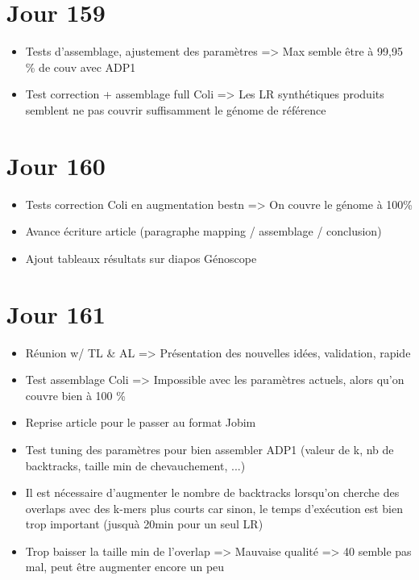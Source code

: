 \documentclass[12pt]{report}
\begin{document}
\section{Jour 159}

\begin{itemize}
	\item Tests d'assemblage, ajustement des paramètres => Max semble être à 99,95 \% de couv avec ADP1
	
	\item Test correction + assemblage full Coli => Les LR synthétiques produits semblent ne pas couvrir suffisamment le génome de référence
\end{itemize}

\section{Jour 160}

\begin{itemize}
	\item Tests correction Coli en augmentation bestn => On couvre le génome à 100\%
	
	\item Avance écriture article (paragraphe mapping / assemblage / conclusion)
	
	\item Ajout tableaux résultats sur diapos Génoscope
\end{itemize}

\section{Jour 161}

\begin{itemize}
	\item Réunion w/ TL \& AL => Présentation des nouvelles idées, validation, rapide
	
	\item Test assemblage Coli => Impossible avec les paramètres actuels, alors qu'on couvre bien à 100 \%
	
	\item Reprise article pour le passer au format Jobim
	
	\item Test tuning des paramètres pour bien assembler ADP1 (valeur de k, nb de backtracks, taille min de chevauchement, ...)
	
	\item Il est nécessaire d'augmenter le nombre de backtracks lorsqu'on cherche des overlaps avec des k-mers plus courts
		  car sinon, le temps d'exécution est bien trop important (jusquà 20min pour un seul LR)
		  
	\item Trop baisser la taille min de l'overlap => Mauvaise qualité => 40 semble pas mal, peut être augmenter encore un peu
\end{itemize}
\end{document}
